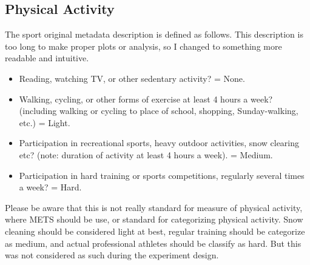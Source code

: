 \subsection{Physical Activity}

The sport original metadata description is defined as follows. This description is too long to make proper plots or analysis, so I changed to something more readable and intuitive.\vspace{3 mm}

\begin{itemize}

	\item Reading, watching TV, or other sedentary activity? = None.
	\item Walking, cycling, or other forms of exercise at least 4 hours a week? (including walking or cycling to place of school, shopping, Sunday-walking, etc.) = Light.
	\item Participation in recreational sports, heavy outdoor activities, snow clearing etc? (note: duration of activity at least 4 hours a week). = Medium.
	\item Participation in hard training or sports competitions, regularly several times a week? = Hard.

\end{itemize}

Please be aware that this is not really standard for measure of physical activity, where METS should be use, or standard for categorizing physical activity. Snow cleaning should be considered light at best, regular training should be categorize as medium, and actual professional athletes should be classify as hard. But this was not considered as such during the experiment design.\vspace{3 mm}

